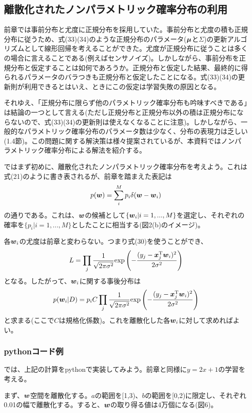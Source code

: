 \documentclass[dvipdfmx, 9pt, a4paper]{jsarticle}
\newcommand{\bm}[1]{{\mbox{\boldmath $#1$}}}
\begin{document}
\subsection{離散化されたノンパラメトリック確率分布の利用}
前章では事前分布と尤度に正規分布を採用していた。事前分布と尤度の積も正規分布に従うため、式(33)(34)のような正規分布のパラメータ($\bm \mu$と$\Sigma$)の更新アルゴリズムとして線形回帰を考えることができた。尤度が正規分布に従うことは多くの場合に言えることである(例えばセンサノイズ)。しかしながら、事前分布を正規分布と仮定することは如何であろうか。正規分布と仮定した結果、最終的に得られるパラメータのバラつきも正規分布と仮定したことになる。式(33)(34)の更新則が利用できるとはいえ、ときにこの仮定は学習失敗の原因となる。\par
それゆえ、「正規分布に限らず他のパラメトリック確率分布も吟味すべきである」は結論の一つとして言える(ただし正規分布と正規分布以外の積は正規分布にならないので、式(33)(34)の更新則は使えなくなることに注意)。しかしながら、一般的なパラメトリック確率分布のパラメータ数は少なく、分布の表現力は乏しい(1.4節)。この問題に関する解決策は様々提案されているが、本資料ではノンパラメトリック確率分布による解法を紹介する。\par
ではまず初めに、離散化されたノンパラメトリック確率分布を考えよう。これは式(21)のように書き表されるが、前章を踏まえた表記は
\begin{equation}
p(\bm w)=\sum_i^M p_i\delta(\bm w-\bm w_i) \notag
\end{equation}
の通りである。これは、$\bm w$の候補として$\{ \bm w_i|i=1,...,M \}$を選定し、それぞれの確率を$\{ p_i|i=1,...,M \}$としたことに相当する(図2(b)のイメージ)。\par
各$\bm w_i$の尤度は前章と変わらない。つまり式(30)を使うことができ、
\begin{equation}
L=\prod_j \frac{1}{\sqrt{2\pi\sigma^2}}{\rm exp}\left(
-\frac{(y_j-\bm x_j^{\rm T}\bm w_i)^2}{2\sigma^2}
\right) \notag
\end{equation}
となる。したがって、$\bm w_i$に関する事後分布は
\begin{equation}
p(\bm w_i|D)=p_iC\prod_j \frac{1}{\sqrt{2\pi\sigma^2}}{\rm exp}\left(
-\frac{(y_j-\bm x_j^{\rm T}\bm w_i)^2}{2\sigma^2}
\right)
\end{equation}
と求まる(ここで$C$は規格化係数)。これを離散化した各$\bm w_i$に対して求めればよい。

\subsubsection{pythonコード例}
では、上記の計算をpythonで実装してみよう。前章と同様に$y=2x+1$の学習を考える。\par
まず、$\bm w$空間を離散化する。$a$の範囲を[1,3)、$b$の範囲を[0,2)に限定し、それぞれ0.01の幅で離散化する。すると、$\bm w$の取り得る値は4万個になる(図6)。\bigskip
\end{document}
